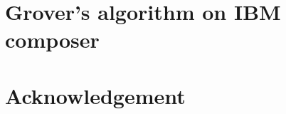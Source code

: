 \documentclass[10pt, a4paper]{article}
\begin{document}
{\newpage

\section{Grover's algorithm on IBM composer}


\section{Acknowledgement}

}




\end{document}
